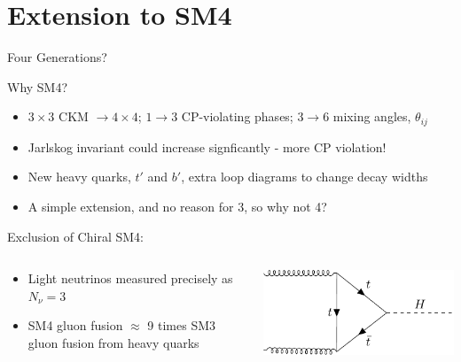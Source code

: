 \documentclass[10pt,xcolor={table,dvipsnames},t]{beamer}
\begin{document}
\section{Extension to SM4}
\begin{frame}{Four Generations?}
    \begin{block}{Why SM4?}
        \begin{itemize}
            \item $3\times3$ CKM $\to4\times4$; $1\to3$ CP-violating phases; $3\to6$ mixing angles, $\theta_{ij}$
            \item Jarlskog invariant could increase signficantly - more CP violation!
            \item New heavy quarks, $t'$ and $b'$, extra loop diagrams to change decay widths
            \item A simple extension, and no reason for 3, so why not 4?
        \end{itemize}
    \end{block}
    \begin{block}{Exclusion of Chiral SM4:}
        \begin{columns}[c]
            \begin{column}{0.55\textwidth}
                \begin{itemize}
                    \item Light neutrinos measured precisely as $N_\nu=3$
                    \item SM4 gluon fusion $\approx$ 9 times SM3 gluon fusion from heavy quarks
                \end{itemize}
            \end{column}
            \begin{column}{0.35\textwidth}
                \includegraphics[width=1.1\textwidth]{../notes/higgs.pdf}
            \end{column}
        \end{columns}
    \end{block}
\end{frame}
\end{document}
